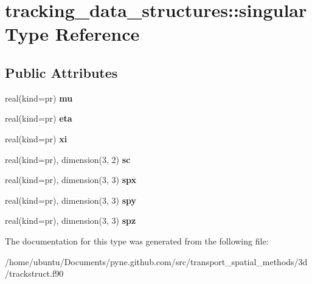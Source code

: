 \hypertarget{structtracking__data__structures_1_1singular}{}\section{tracking\+\_\+data\+\_\+structures\+:\+:singular Type Reference}
\label{structtracking__data__structures_1_1singular}
\subsection*{Public Attributes}
\begin{DoxyCompactItemize}
\item 
real(kind=pr) {\bfseries mu}\hypertarget{structtracking__data__structures_1_1singular_acd79fe7d9374778a1a073f01d33bc323}{}\label{structtracking__data__structures_1_1singular_acd79fe7d9374778a1a073f01d33bc323}

\item 
real(kind=pr) {\bfseries eta}\hypertarget{structtracking__data__structures_1_1singular_a8015e49ee70edd759eb801446b40de59}{}\label{structtracking__data__structures_1_1singular_a8015e49ee70edd759eb801446b40de59}

\item 
real(kind=pr) {\bfseries xi}\hypertarget{structtracking__data__structures_1_1singular_ac42e62b9f85705c6e68a6d07bc6c889c}{}\label{structtracking__data__structures_1_1singular_ac42e62b9f85705c6e68a6d07bc6c889c}

\item 
real(kind=pr), dimension(3, 2) {\bfseries sc}\hypertarget{structtracking__data__structures_1_1singular_ae99e040b2944a8f103cb730cef072f7b}{}\label{structtracking__data__structures_1_1singular_ae99e040b2944a8f103cb730cef072f7b}

\item 
real(kind=pr), dimension(3, 3) {\bfseries spx}\hypertarget{structtracking__data__structures_1_1singular_aeb81711c1d7153fe3dc8eae682f08134}{}\label{structtracking__data__structures_1_1singular_aeb81711c1d7153fe3dc8eae682f08134}

\item 
real(kind=pr), dimension(3, 3) {\bfseries spy}\hypertarget{structtracking__data__structures_1_1singular_ab7f1cf71b301b3dd7b30004bb3fecbea}{}\label{structtracking__data__structures_1_1singular_ab7f1cf71b301b3dd7b30004bb3fecbea}

\item 
real(kind=pr), dimension(3, 3) {\bfseries spz}\hypertarget{structtracking__data__structures_1_1singular_a5bfe4d508ca8ba24ddd3c14c20c03086}{}\label{structtracking__data__structures_1_1singular_a5bfe4d508ca8ba24ddd3c14c20c03086}

\end{DoxyCompactItemize}


The documentation for this type was generated from the following file\+:\begin{DoxyCompactItemize}
\item 
/home/ubuntu/\+Documents/pyne.\+github.\+com/src/transport\+\_\+spatial\+\_\+methods/3d/trackstruct.\+f90\end{DoxyCompactItemize}
